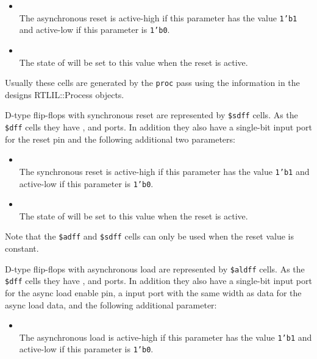 \begin{itemize}
\item {} \\
The asynchronous reset is active-high if this parameter has the value {\tt 1'b1} and active-low
if this parameter is {\tt 1'b0}.

\item {} \\
The state of  will be set to this value when the reset is active.
\end{itemize}

\begin{sloppypar}
Usually these cells are generated by the {\tt proc} pass using the information
in the designs RTLIL::Process objects.
\end{sloppypar}

D-type flip-flops with synchronous reset are represented by {\tt \$sdff} cells. As the {\tt \$dff}
cells they have ,  and  ports. In addition they also have a single-bit 
input port for the reset pin and the following additional two parameters:

\begin{itemize}
\item {} \\
The synchronous reset is active-high if this parameter has the value {\tt 1'b1} and active-low
if this parameter is {\tt 1'b0}.

\item {} \\
The state of  will be set to this value when the reset is active.
\end{itemize}

Note that the {\tt \$adff} and {\tt \$sdff} cells can only be used when the reset value is constant.

D-type flip-flops with asynchronous load are represented by {\tt \$aldff} cells. As the {\tt \$dff}
cells they have ,  and  ports. In addition they also have a single-bit 
input port for the async load enable pin, a  input port with the same width as data for
the async load data, and the following additional parameter:

\begin{itemize}
\item {} \\
The asynchronous load is active-high if this parameter has the value {\tt 1'b1} and active-low
if this parameter is {\tt 1'b0}.
\end{itemize}

